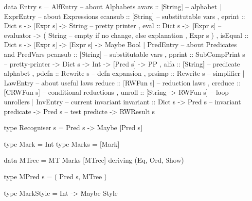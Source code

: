 \begin{code}
data Entry s =
   AlfEntry {   -- about Alphabets
    avars   :: [String]  -- alphabet
   }
 | ExprEntry { -- about Expressions
     ecansub :: [String]                   -- substitutable vars
   , eprint  :: Dict s -> [Expr s] -> String   -- pretty printer
   , eval    :: Dict s -> [Expr s]                  -- evaluator
             -> ( String -- empty if no change, else explanation
                , Expr s )
   , isEqual :: Dict s -> [Expr s] -> [Expr s] -> Maybe Bool
   }
 | PredEntry {    -- about Predicates and PredVars
     pcansub :: [String]                   -- substitutable vars
   , pprint  :: SubCompPrint s                 -- pretty-printer
             -> Dict s -> Int -> [Pred s]
             -> PP
   , alfa :: [String]                      -- predicate alphabet
   , pdefn   :: Rewrite s                      -- defn expansion
   , prsimp  :: Rewrite s                          -- simplifier
   }
 | LawEntry {  -- about useful laws
     reduce  :: [RWFun s]            -- reduction laws
   , creduce :: [CRWFun s]           -- conditional reductions
   , unroll  :: [String -> RWFun s]  -- loop unrollers
   }
 | InvEntry { -- current invariant
     invariant :: Dict s
               -> Pred s      -- invariant predicate
               -> Pred s      -- test predicte
               -> RWResult s
   }
\end{code}

\begin{code}
type Recogniser s = Pred s -> Maybe [Pred s]
\end{code}


\newpage
{}


\begin{code}
type Mark = Int
type Marks = [Mark]
\end{code}

\begin{code}
data MTree = MT Marks [MTree] deriving (Eq, Ord, Show)
\end{code}

\begin{code}
type MPred s = ( Pred s, MTree )
\end{code}

\begin{code}
type MarkStyle = Int -> Maybe Style
\end{code}

